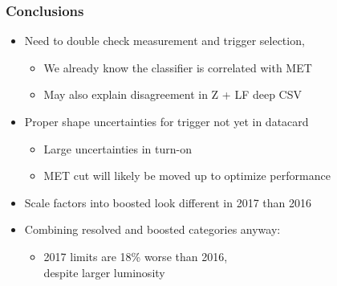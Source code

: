 \documentclass{beamer}
\begin{document}
\begin{frame}
  \frametitle{Conclusions}
  \begin{itemize}
  \item Need to double check measurement and trigger selection,
    \begin{itemize}
    \item We already know the classifier is correlated with MET
    \item May also explain disagreement in Z + LF deep CSV
    \end{itemize}
  \item Proper shape uncertainties for trigger not yet in datacard
    \begin{itemize}
    \item Large uncertainties in turn-on
    \item MET cut will likely be moved up to optimize performance
    \end{itemize}
  \item Scale factors into boosted look different in 2017 than 2016
  \item Combining resolved and boosted categories anyway:
    \begin{itemize}
    \item 2017 limits are 18\% worse than 2016, \\
      despite larger luminosity
    \end{itemize}
  \end{itemize}
\end{frame}
\end{document}
